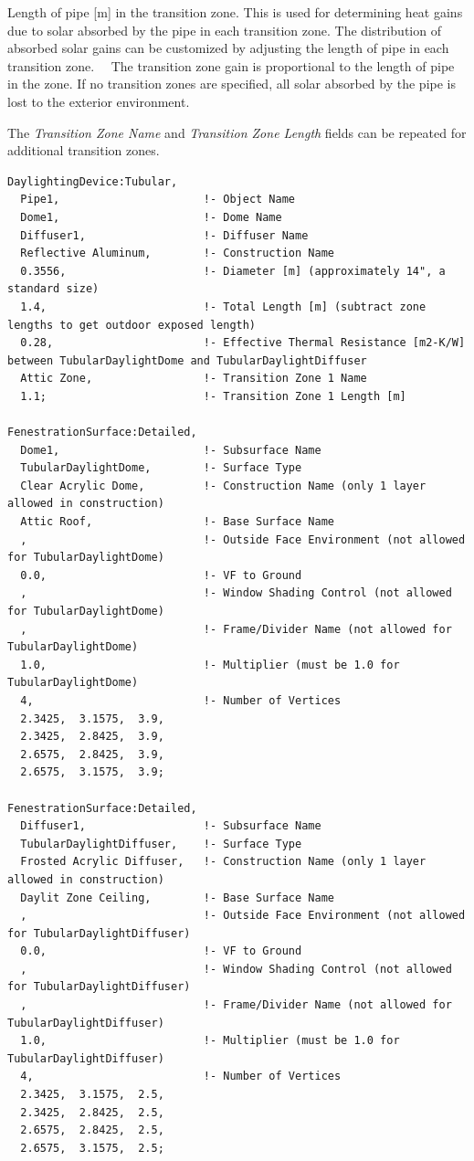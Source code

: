 Length of pipe {[}m{]} in the transition zone. This is used for determining heat gains due to solar absorbed by the pipe in each transition zone. The distribution of absorbed solar gains can be customized by adjusting the length of pipe in each transition zone.~~ The transition zone gain is proportional to the length of pipe in the zone. If no transition zones are specified, all solar absorbed by the pipe is lost to the exterior environment.

The \emph{Transition Zone Name} and \emph{Transition Zone Length} fields can be repeated for additional transition zones.

\begin{lstlisting}
DaylightingDevice:Tubular,
  Pipe1,                      !- Object Name
  Dome1,                      !- Dome Name
  Diffuser1,                  !- Diffuser Name
  Reflective Aluminum,        !- Construction Name
  0.3556,                     !- Diameter [m] (approximately 14", a standard size)
  1.4,                        !- Total Length [m] (subtract zone lengths to get outdoor exposed length)
  0.28,                       !- Effective Thermal Resistance [m2-K/W] between TubularDaylightDome and TubularDaylightDiffuser
  Attic Zone,                 !- Transition Zone 1 Name
  1.1;                        !- Transition Zone 1 Length [m]

FenestrationSurface:Detailed,
  Dome1,                      !- Subsurface Name
  TubularDaylightDome,        !- Surface Type
  Clear Acrylic Dome,         !- Construction Name (only 1 layer allowed in construction)
  Attic Roof,                 !- Base Surface Name
  ,                           !- Outside Face Environment (not allowed for TubularDaylightDome)
  0.0,                        !- VF to Ground
  ,                           !- Window Shading Control (not allowed for TubularDaylightDome)
  ,                           !- Frame/Divider Name (not allowed for TubularDaylightDome)
  1.0,                        !- Multiplier (must be 1.0 for TubularDaylightDome)
  4,                          !- Number of Vertices
  2.3425,  3.1575,  3.9,
  2.3425,  2.8425,  3.9,
  2.6575,  2.8425,  3.9,
  2.6575,  3.1575,  3.9;

FenestrationSurface:Detailed,
  Diffuser1,                  !- Subsurface Name
  TubularDaylightDiffuser,    !- Surface Type
  Frosted Acrylic Diffuser,   !- Construction Name (only 1 layer allowed in construction)
  Daylit Zone Ceiling,        !- Base Surface Name
  ,                           !- Outside Face Environment (not allowed for TubularDaylightDiffuser)
  0.0,                        !- VF to Ground
  ,                           !- Window Shading Control (not allowed for TubularDaylightDiffuser)
  ,                           !- Frame/Divider Name (not allowed for TubularDaylightDiffuser)
  1.0,                        !- Multiplier (must be 1.0 for TubularDaylightDiffuser)
  4,                          !- Number of Vertices
  2.3425,  3.1575,  2.5,
  2.3425,  2.8425,  2.5,
  2.6575,  2.8425,  2.5,
  2.6575,  3.1575,  2.5;
\end{lstlisting}

